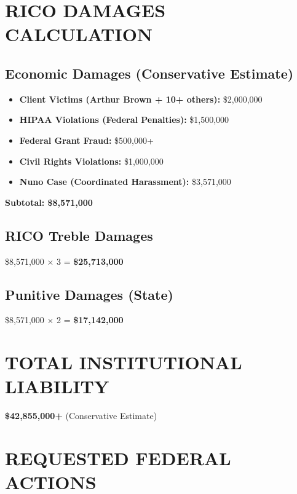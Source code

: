 \documentclass[12pt,oneside]{article}
\begin{document}
\section*{RICO DAMAGES CALCULATION}

\subsection*{Economic Damages (Conservative Estimate)}

\begin{itemize}
\item \textbf{Client Victims (Arthur Brown + 10+ others):} \$2,000,000
\item \textbf{HIPAA Violations (Federal Penalties):} \$1,500,000
\item \textbf{Federal Grant Fraud:} \$500,000+
\item \textbf{Civil Rights Violations:} \$1,000,000
\item \textbf{Nuno Case (Coordinated Harassment):} \$3,571,000
\end{itemize}

\textbf{Subtotal: \$8,571,000}

\subsection*{RICO Treble Damages}

\$8,571,000 × 3 = \textbf{\$25,713,000}

\subsection*{Punitive Damages (State)}

\$8,571,000 × 2 = \textbf{\$17,142,000}

\section*{TOTAL INSTITUTIONAL LIABILITY}

\textbf{\$42,855,000+} (Conservative Estimate)

\newpage

\section*{REQUESTED FEDERAL ACTIONS}
\end{document}
